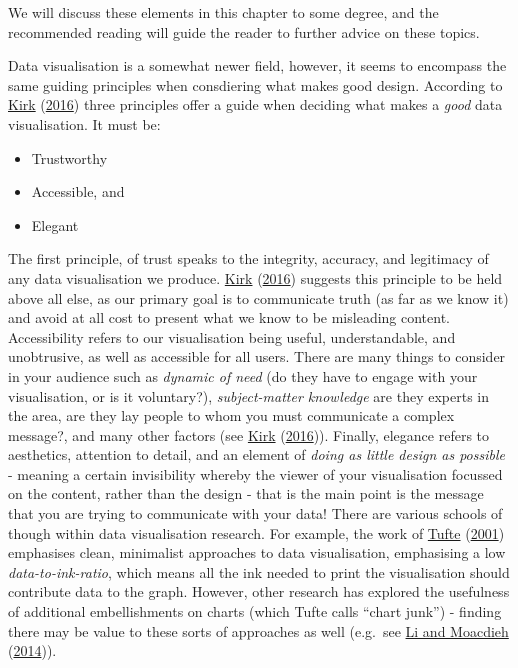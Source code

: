 \documentclass[
  krantz2]{krantz}
\providecommand{\tightlist}{%
  \setlength{\itemsep}{0pt}\setlength{\parskip}{0pt}}
\begin{document}
We will discuss these elements in this chapter to some degree, and the recommended reading will guide the reader to further advice on these topics.

Data visualisation is a somewhat newer field, however, it seems to encompass the same guiding principles when consdiering what makes good design. According to \protect\hyperlink{ref-Kirk_2016}{Kirk} (\protect\hyperlink{ref-Kirk_2016}{2016}) three principles offer a guide when deciding what makes a \emph{good} data visualisation. It must be:

\begin{itemize}
\tightlist
\item
  Trustworthy
\item
  Accessible, and
\item
  Elegant
\end{itemize}

The first principle, of trust speaks to the integrity, accuracy, and legitimacy of any data visualisation we produce. \protect\hyperlink{ref-Kirk_2016}{Kirk} (\protect\hyperlink{ref-Kirk_2016}{2016}) suggests this principle to be held above all else, as our primary goal is to communicate truth (as far as we know it) and avoid at all cost to present what we know to be misleading content. Accessibility refers to our visualisation being useful, understandable, and unobtrusive, as well as accessible for all users. There are many things to consider in your audience such as \emph{dynamic of need} (do they have to engage with your visualisation, or is it voluntary?), \emph{subject-matter knowledge} are they experts in the area, are they lay people to whom you must communicate a complex message?, and many other factors (see \protect\hyperlink{ref-Kirk_2016}{Kirk} (\protect\hyperlink{ref-Kirk_2016}{2016})). Finally, elegance refers to aesthetics, attention to detail, and an element of \emph{doing as little design as possible} - meaning a certain invisibility whereby the viewer of your visualisation focussed on the content, rather than the design - that is the main point is the message that you are trying to communicate with your data! There are various schools of though within data visualisation research. For example, the work of \protect\hyperlink{ref-Tufte_2001}{Tufte} (\protect\hyperlink{ref-Tufte_2001}{2001}) emphasises clean, minimalist approaches to data visualisation, emphasising a low \emph{data-to-ink-ratio}, which means all the ink needed to print the visualisation should contribute data to the graph. However, other research has explored the usefulness of additional embellishments on charts (which Tufte calls ``chart junk'') - finding there may be value to these sorts of approaches as well (e.g.~see \protect\hyperlink{ref-Li_2014}{Li and Moacdieh} (\protect\hyperlink{ref-Li_2014}{2014})).
\end{document}

